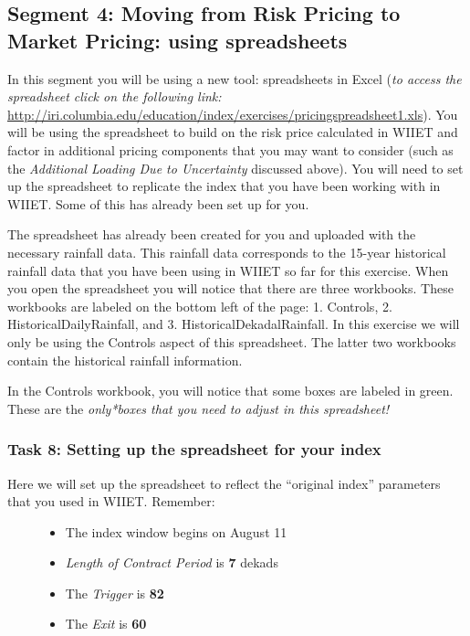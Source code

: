 \documentclass[letterpaper,10pt,english]{sphinxmanual}
\begin{document}
\subsection{Segment 4: Moving from Risk Pricing to Market Pricing: using spreadsheets}
\label{wiiet/wiiet_initialtomarketpricing_Web:segment-4-moving-from-risk-pricing-to-market-pricing-using-spreadsheets}
In this segment you will be using a new tool: spreadsheets in Excel (\emph{to access the spreadsheet click on the following link:} \href{http://iri.columbia.edu/education/index/exercises/pricingspreadsheet1.xls}{http://iri.columbia.edu/education/index/exercises/pricingspreadsheet1.xls}). You will be using the spreadsheet to build on the risk price calculated in WIIET and factor in additional pricing components that you may want to consider (such as the \emph{Additional Loading Due to Uncertainty} discussed above). You will need to set up the spreadsheet to replicate the index that you have been working with in WIIET. Some of this has already been set up for you.

The spreadsheet has already been created for you and uploaded with the necessary rainfall data. This rainfall data corresponds to the 15-year historical rainfall data that you have been using in WIIET so far for this exercise. When you open the spreadsheet you will notice that there are three workbooks. These workbooks are labeled on the bottom left of the page: 1. Controls, 2. HistoricalDailyRainfall, and 3. HistoricalDekadalRainfall. In this exercise we will only be using the Controls aspect of this spreadsheet. The latter two workbooks contain the historical rainfall information.

In the Controls workbook, you will notice that some boxes are labeled in green. These are the \emph{only*boxes that you need to adjust in this spreadsheet!}


\subsubsection{Task 8: Setting up the spreadsheet for your index}
\label{wiiet/wiiet_initialtomarketpricing_Web:task-8-setting-up-the-spreadsheet-for-your-index}\begin{description}
\item[{Here we will set up the spreadsheet to reflect the ``original index'' parameters that you used in WIIET. Remember:}] \leavevmode\begin{itemize}
\item {} 
The index window begins on August 11

\item {} 
\emph{Length of Contract Period} is \textbf{7} dekads

\item {} 
The \emph{Trigger} is \textbf{82}

\item {} 
The \emph{Exit} is \textbf{60}

\end{itemize}

\end{description}
\end{document}
